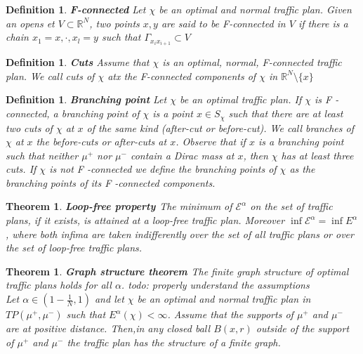 \documentclass[11pt,reqno,a4paper]{amsart}
\numberwithin{equation}{section}
\theoremstyle{mytheorem}
\newtheorem{theorem}[subsection]{Theorem}
\newtheorem{definition}[subsubsection]{Definition}
\theoremstyle{myremark}
\theoremstyle{myparagraph}
\newcommand{\R}{\mathbb{R}}
\begin{document}
    \begin{definition}
        \textbf{F-connected}
        Let $\chi$ be an optimal and normal traffic plan. Given an opens et $V \subset \R^N$, two points $x,y$ are said to be F-connected in $V$
        if there is a chain $x_1=x,\cdot, x_l= y$ such that $\Gamma_{x_{i}x_{i+1}} \subset V$
    \end{definition}

    \begin{definition}
        \textbf{Cuts}
        Assume that $\chi$ is an optimal, normal, F-connected traffic plan. We call cuts of $\chi$ atx the F-connected components of
        $\chi$ in $\R^N \setminus \{x\}$
    \end{definition}

    \begin{definition}
        \textbf{Branching point}
        Let $\chi$ be an optimal traffic plan. If $\chi$ is F -connected, a branching point of $\chi$ is a point $x \in S_{\chi}$ such that
        there are at least two cuts of $\chi$ at $x$ of the same kind (after-cut or before-cut).
        We call branches of $\chi$ at $x$ the before-cuts or after-cuts at $x$.
        Observe that if $x$ is a branching point such that neither $\mu^+$ nor $\mu^-$ contain a Dirac mass at $x$, then $\chi$ has at least
        three cuts.
        If $\chi$ is not F -connected we define the branching points of $\chi$ as the branching points of its F -connected components.
    \end{definition}



    \begin{theorem}
        \textbf{Loop-free property \cite[Proposition 4.9]{Bernot}}
        \label{lemma:loop_free}
        The minimum of $\mathcal{E}^{\alpha}$ on the set of traffic plans, if it exists, is attained
        at a loop-free traffic plan. Moreover $\inf\mathcal{E}^{\alpha} =\inf E^\alpha$, where both
        infima are taken indifferently over the set of all traffic plans or over the set of loop-free traffic
        plans.

      \end{theorem}

    \begin{theorem}
        \textbf{Graph structure theorem \cite[Lemma 8.14]{Bernot}}
        \cite[Theorem ?]{well_posedness}
        The finite graph structure of optimal traffic plans holds for all $\alpha$.
        todo: properly understand the assumptions
        \\

        Let $\alpha \in \left( 1-\frac{1}{N}, 1 \right)$ and let $\chi$ be an optimal and normal traffic
        plan in $TP(\mu^+, \mu^-)$ such that $E^\alpha(\chi) < \infty$. Assume that the supports
        of $\mu^+$ and $\mu^-$ are at positive distance. Then,in any closed ball $B(x, r)$ outside
        of the support of $\mu^+$ and $\mu^-$ the traffic plan has the structure of a finite graph.


    \end{theorem}
\end{document}
